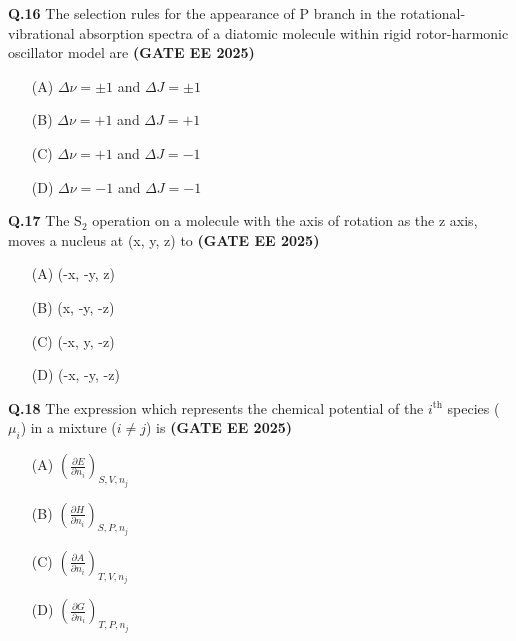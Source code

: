 \documentclass[journal,12pt,onecolumn]{exam}
\theoremstyle{remark}
\begin{document}
\noindent \textbf{Q.16} The selection rules for the appearance of P branch in the rotational-vibrational absorption spectra of a diatomic molecule within rigid rotor-harmonic oscillator model are \hfill{\textbf{(GATE EE 2025)}}
\begin{multicols}{2}
\begin{itemize}[leftmargin=*,labelsep=1em]
    \item[(A)] $\Delta \nu = \pm 1$ and $\Delta J = \pm 1$
    \item[(B)] $\Delta \nu = +1$ and $\Delta J = +1$
    \item[(C)] $\Delta \nu = +1$ and $\Delta J = -1$
    \item[(D)] $\Delta \nu = -1$ and $\Delta J = -1$
\end{itemize}
\end{multicols}
\vspace{0.5 cm}

\noindent \textbf{Q.17} The S$_2$ operation on a molecule with the axis of rotation as the z axis, moves a nucleus at (x, y, z) to \hfill{\textbf{(GATE EE 2025)}}
\begin{multicols}{2}
\begin{itemize}[leftmargin=*,labelsep=1em]
    \item[(A)] (-x, -y, z)
    \item[(B)] (x, -y, -z)
    \item[(C)] (-x, y, -z)
    \item[(D)] (-x, -y, -z)
\end{itemize}
\end{multicols}
\vspace{0.5 cm}

\noindent \textbf{Q.18} The expression which represents the chemical potential of the $i^{\text{th}}$ species ($\mu_i$) in a mixture ($i \ne j$) is \hfill{\textbf{(GATE EE 2025)}}
\begin{multicols}{2}
\begin{itemize}[leftmargin=*,labelsep=1em]
    \item[(A)] $\left( \frac{\partial E}{\partial n_i} \right)_{S,V,n_j}$
    \item[(B)] $\left( \frac{\partial H}{\partial n_i} \right)_{S,P,n_j}$
    \item[(C)] $\left( \frac{\partial A}{\partial n_i} \right)_{T,V,n_j}$
    \item[(D)] $\left( \frac{\partial G}{\partial n_i} \right)_{T,P,n_j}$
\end{itemize}
\end{multicols}
\vspace{0.5 cm}
\end{document}
